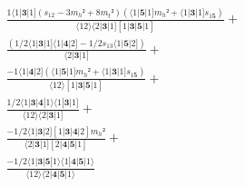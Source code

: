 \documentclass[varwidth, border=5pt]{standalone}
\begin{document}
\begin{my}
$\begin{gathered}
\scriptscriptstyle\frac{1⟨1|𝟑|1](s_{12}-3m_h²+8m_t²)(⟨1|𝟓|1]m_h²+⟨1|𝟑|1]s_{1𝟓})}{⟨12⟩⟨2|𝟑|1][1|𝟑|𝟓|1]} +\\
\scriptscriptstyle\frac{(1/2⟨1|𝟑|1]⟨1|𝟒|2]-1/2s_{13}⟨1|𝟓|2])}{⟨2|𝟑|1]} +\\
\scriptscriptstyle\frac{-1⟨1|𝟒|2](⟨1|𝟓|1]m_h²+⟨1|𝟑|1]s_{1𝟓})}{⟨12⟩[1|𝟑|𝟓|1]} +\\
\scriptscriptstyle\frac{1/2⟨1|𝟑|𝟒|1⟩⟨1|𝟑|1]}{⟨12⟩⟨2|𝟑|1]} +\\
\scriptscriptstyle\frac{-1/2⟨1|𝟑|2][1|𝟑|𝟒|2]m_h²}{⟨2|𝟑|1][2|𝟒|𝟓|1]} +\\
\scriptscriptstyle\frac{-1/2⟨1|𝟑|𝟓|1⟩⟨1|𝟒|𝟓|1⟩}{⟨12⟩⟨2|𝟒|𝟓|1⟩} \phantom{+}
\end{gathered}$
\end{my}
\end{document}
